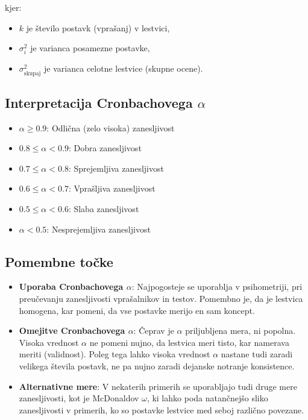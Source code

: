 kjer:
\begin{itemize}
    \item $k$ je število postavk (vprašanj) v lestvici,
    \item $\sigma^2_{i}$ je varianca posamezne postavke,
    \item $\sigma^2_{\text{skupaj}}$ je varianca celotne lestvice (skupne ocene).
\end{itemize}

\subsection*{Interpretacija Cronbachovega $\alpha$}

\begin{itemize}
    \item $\alpha \geq 0.9$: Odlična (zelo visoka) zanesljivost
    \item $0.8 \leq \alpha < 0.9$: Dobra zanesljivost
    \item $0.7 \leq \alpha < 0.8$: Sprejemljiva zanesljivost
    \item $0.6 \leq \alpha < 0.7$: Vprašljiva zanesljivost
    \item $0.5 \leq \alpha < 0.6$: Slaba zanesljivost
    \item $\alpha < 0.5$: Nesprejemljiva zanesljivost
\end{itemize}

\subsection*{Pomembne točke}

\begin{itemize}
    \item \textbf{Uporaba Cronbachovega $\alpha$}: Najpogosteje se uporablja v psihometriji, pri preučevanju zanesljivosti vprašalnikov in testov. Pomembno je, da je lestvica homogena, kar pomeni, da vse postavke merijo en sam koncept.
    \item \textbf{Omejitve Cronbachovega $\alpha$}: Čeprav je $\alpha$ priljubljena mera, ni popolna. Visoka vrednost $\alpha$ ne pomeni nujno, da lestvica meri tisto, kar namerava meriti (validnost). Poleg tega lahko visoka vrednost $\alpha$ nastane tudi zaradi velikega števila postavk, ne pa nujno zaradi dejanske notranje konsistence.
    \item \textbf{Alternativne mere}: V nekaterih primerih se uporabljajo tudi druge mere zanesljivosti, kot je McDonaldov $\omega$, ki lahko poda natančnejšo sliko zanesljivosti v primerih, ko so postavke lestvice med seboj različno povezane.
\end{itemize}

